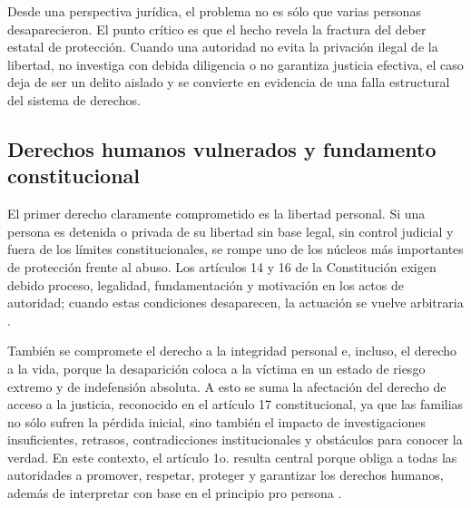 \documentclass[
	spanish,
	letterpaper, oneside
]{article}
\begin{document}
\noindent{}

Desde una perspectiva jurídica, el problema no es sólo que varias personas desaparecieron. El punto crítico es que el hecho revela la fractura del deber estatal de protección. Cuando una autoridad no evita la privación ilegal de la libertad, no investiga con debida diligencia o no garantiza justicia efectiva, el caso deja de ser un delito aislado y se convierte en evidencia de una falla estructural del sistema de derechos.

\subsection{Derechos humanos vulnerados y fundamento constitucional}

El primer derecho claramente comprometido es la libertad personal. Si una persona es detenida o privada de su libertad sin base legal, sin control judicial y fuera de los límites constitucionales, se rompe uno de los núcleos más importantes de protección frente al abuso. Los artículos 14 y 16 de la Constitución exigen debido proceso, legalidad, fundamentación y motivación en los actos de autoridad; cuando estas condiciones desaparecen, la actuación se vuelve arbitraria \citep{constitucionCPEUM2026}.

También se compromete el derecho a la integridad personal e, incluso, el derecho a la vida, porque la desaparición coloca a la víctima en un estado de riesgo extremo y de indefensión absoluta. A esto se suma la afectación del derecho de acceso a la justicia, reconocido en el artículo 17 constitucional, ya que las familias no sólo sufren la pérdida inicial, sino también el impacto de investigaciones insuficientes, retrasos, contradicciones institucionales y obstáculos para conocer la verdad. En este contexto, el artículo 1o. resulta central porque obliga a todas las autoridades a promover, respetar, proteger y garantizar los derechos humanos, además de interpretar con base en el principio pro persona \citep{constitucionCPEUM2026}.
\end{document}
